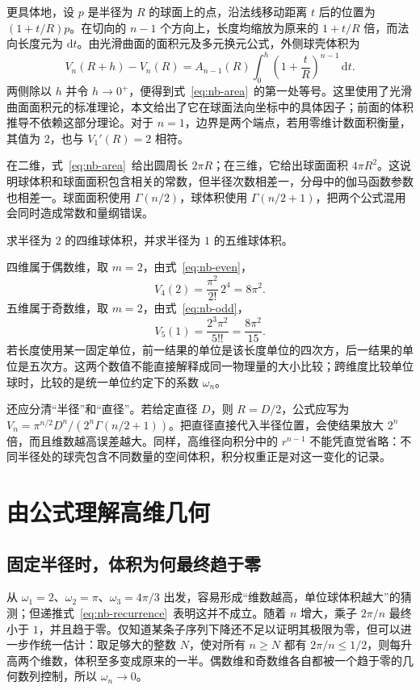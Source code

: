 \documentclass[UTF8]{ctexart}
\begin{document}
更具体地，设 $p$ 是半径为 $R$ 的球面上的点，沿法线移动距离 $t$ 后的位置为 $(1+t/R)p$。在切向的 $n-1$ 个方向上，长度均缩放为原来的 $1+t/R$ 倍，而法向长度元为 $\mathrm dt$。由光滑曲面的面积元及多元换元公式，外侧球壳体积为
\[
  V_n(R+h)-V_n(R)
  =A_{n-1}(R)\int_0^h\left(1+\frac tR\right)^{n-1}\,\mathrm dt.
\]
两侧除以 $h$ 并令 $h\to0^+$，便得到式~\eqref{eq:nb-area}~的第一处等号。这里使用了光滑曲面面积元的标准理论，本文给出了它在球面法向坐标中的具体因子；前面的体积推导不依赖这部分理论。对于 $n=1$，边界是两个端点，若用零维计数面积衡量，其值为 $2$，也与 $V_1'(R)=2$ 相符。

在二维，式~\eqref{eq:nb-area}~给出圆周长 $2\pi R$；在三维，它给出球面面积 $4\pi R^2$。这说明球体积和球面面积包含相关的常数，但半径次数相差一，分母中的伽马函数参数也相差一。球面面积使用 $\Gamma(n/2)$，球体积使用 $\Gamma(n/2+1)$，把两个公式混用会同时造成常数和量纲错误。

\begin{example}[四维球与五维球的体积]
求半径为 $2$ 的四维球体积，并求半径为 $1$ 的五维球体积。
\end{example}
\begin{solve}
四维属于偶数维，取 $m=2$，由式~\eqref{eq:nb-even}，
\[
  V_4(2)=\frac{\pi^2}{2!}\,2^4=8\pi^2.
\]
五维属于奇数维，取 $m=2$，由式~\eqref{eq:nb-odd}，
\[
  V_5(1)=\frac{2^3\pi^2}{5!!}=\frac{8\pi^2}{15}.
\]
若长度使用某一固定单位，前一结果的单位是该长度单位的四次方，后一结果的单位是五次方。这两个数值不能直接解释成同一物理量的大小比较；跨维度比较单位球时，比较的是统一单位约定下的系数 $\omega_n$。
\end{solve}

还应分清“半径”和“直径”。若给定直径 $D$，则 $R=D/2$，公式应写为 $V_n=\pi^{n/2}D^n/(2^n\Gamma(n/2+1))$。把直径直接代入半径位置，会使结果放大 $2^n$ 倍，而且维数越高误差越大。同样，高维径向积分中的 $r^{n-1}$ 不能凭直觉省略：不同半径处的球壳包含不同数量的空间体积，积分权重正是对这一变化的记录。

\section{由公式理解高维几何}
\label{sec:nb-high-dimensional}

\subsection{固定半径时，体积为何最终趋于零}

从 $\omega_1=2$、$\omega_2=\pi$、$\omega_3=4\pi/3$ 出发，容易形成“维数越高，单位球体积越大”的猜测；但递推式~\eqref{eq:nb-recurrence}~表明这并不成立。随着 $n$ 增大，乘子 $2\pi/n$ 最终小于 $1$，并且趋于零。仅知道某条子序列下降还不足以证明其极限为零，但可以进一步作统一估计：取足够大的整数 $N$，使对所有 $n\geq N$ 都有 $2\pi/n\leq1/2$，则每升高两个维数，体积至多变成原来的一半。偶数维和奇数维各自都被一个趋于零的几何数列控制，所以 $\omega_n\to0$。
\end{document}
